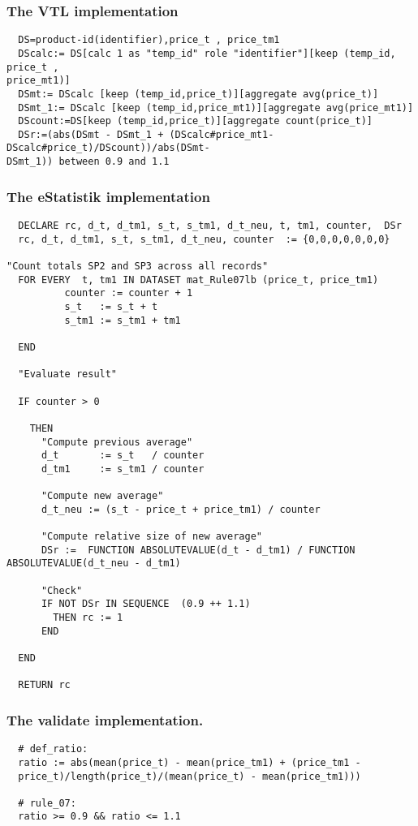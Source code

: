 \subsubsection*{The VTL implementation}
\begin{verbatim}
  DS=product-id(identifier),price_t , price_tm1
  DScalc:= DS[calc 1 as "temp_id" role "identifier"][keep (temp_id, price_t ,
price_mt1)]
  DSmt:= DScalc [keep (temp_id,price_t)][aggregate avg(price_t)]
  DSmt_1:= DScalc [keep (temp_id,price_mt1)][aggregate avg(price_mt1)]
  DScount:=DS[keep (temp_id,price_t)][aggregate count(price_t)]
  DSr:=(abs(DSmt - DSmt_1 + (DScalc#price_mt1- DScalc#price_t)/DScount))/abs(DSmt-
DSmt_1)) between 0.9 and 1.1
\end{verbatim}
\subsubsection*{The eStatistik implementation}
\begin{verbatim}
  DECLARE rc, d_t, d_tm1, s_t, s_tm1, d_t_neu, t, tm1, counter,  DSr
  rc, d_t, d_tm1, s_t, s_tm1, d_t_neu, counter  := {0,0,0,0,0,0,0}

"Count totals SP2 and SP3 across all records"
  FOR EVERY  t, tm1 IN DATASET mat_Rule07lb (price_t, price_tm1)
          counter := counter + 1
          s_t   := s_t + t
          s_tm1 := s_tm1 + tm1

  END

  "Evaluate result"

  IF counter > 0

    THEN 
      "Compute previous average"
      d_t       := s_t   / counter
      d_tm1     := s_tm1 / counter
	
      "Compute new average"
      d_t_neu := (s_t - price_t + price_tm1) / counter

      "Compute relative size of new average"
      DSr :=  FUNCTION ABSOLUTEVALUE(d_t - d_tm1) / FUNCTION ABSOLUTEVALUE(d_t_neu - d_tm1)

      "Check"
      IF NOT DSr IN SEQUENCE  (0.9 ++ 1.1)
        THEN rc := 1
      END

  END 
 
  RETURN rc
\end{verbatim}
\subsubsection*{The validate implementation.}
\begin{verbatim}
  # def_ratio:
  ratio := abs(mean(price_t) - mean(price_tm1) + (price_tm1 -
  price_t)/length(price_t)/(mean(price_t) - mean(price_tm1)))

  # rule_07:
  ratio >= 0.9 && ratio <= 1.1
\end{verbatim}


